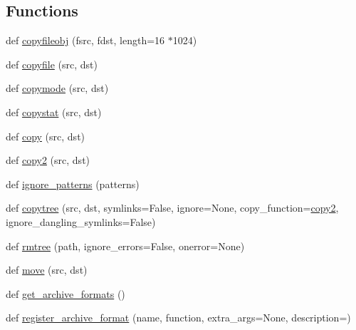\subsection*{Functions}
\begin{DoxyCompactItemize}
\item 
def \hyperlink{namespacepip_1_1__vendor_1_1distlib_1_1__backport_1_1shutil_a7442a4e81c79063ab281db6efd529217}{copyfileobj} (fsrc, fdst, length=16 $\ast$1024)
\item 
def \hyperlink{namespacepip_1_1__vendor_1_1distlib_1_1__backport_1_1shutil_af6299c4bda796051a67a4fa1b38c3f11}{copyfile} (src, dst)
\item 
def \hyperlink{namespacepip_1_1__vendor_1_1distlib_1_1__backport_1_1shutil_a142322b1c0471c60f6d055dc61968bc7}{copymode} (src, dst)
\item 
def \hyperlink{namespacepip_1_1__vendor_1_1distlib_1_1__backport_1_1shutil_aa7588cc037e9e7257a99c99f1ba5e436}{copystat} (src, dst)
\item 
def \hyperlink{namespacepip_1_1__vendor_1_1distlib_1_1__backport_1_1shutil_aaa01ac0561f19e4e36b246949e3cff19}{copy} (src, dst)
\item 
def \hyperlink{namespacepip_1_1__vendor_1_1distlib_1_1__backport_1_1shutil_af85eb3a739ebeb55736df79248341bb5}{copy2} (src, dst)
\item 
def \hyperlink{namespacepip_1_1__vendor_1_1distlib_1_1__backport_1_1shutil_af05e2daf581728865ed0aee7f6b86737}{ignore\+\_\+patterns} (patterns)
\item 
def \hyperlink{namespacepip_1_1__vendor_1_1distlib_1_1__backport_1_1shutil_ac26f34e45d01ee06abf3b2cd47e154a1}{copytree} (src, dst, symlinks=False, ignore=None, copy\+\_\+function=\hyperlink{namespacepip_1_1__vendor_1_1distlib_1_1__backport_1_1shutil_af85eb3a739ebeb55736df79248341bb5}{copy2}, ignore\+\_\+dangling\+\_\+symlinks=False)
\item 
def \hyperlink{namespacepip_1_1__vendor_1_1distlib_1_1__backport_1_1shutil_ad9316bb980d6a793b7310511c09d95d4}{rmtree} (path, ignore\+\_\+errors=False, onerror=None)
\item 
def \hyperlink{namespacepip_1_1__vendor_1_1distlib_1_1__backport_1_1shutil_a522df1c40262dc8bea9342864177d387}{move} (src, dst)
\item 
def \hyperlink{namespacepip_1_1__vendor_1_1distlib_1_1__backport_1_1shutil_a0f02e72a471872ab222973d2903fdf13}{get\+\_\+archive\+\_\+formats} ()
\item 
def \hyperlink{namespacepip_1_1__vendor_1_1distlib_1_1__backport_1_1shutil_af17d1c85c6b94b9e07f123dd667d5edb}{register\+\_\+archive\+\_\+format} (name, function, extra\+\_\+args=None, description=\textquotesingle{}\textquotesingle{})

\end{DoxyCompactItemize}
